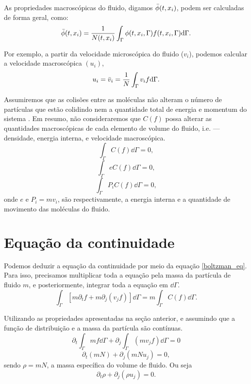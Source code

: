  As propriedades macroscópicas do fluido, digamos $\Bar{\phi}(t, x_{i})$, podem ser calculadas de forma geral, como:
\begin{equation}
    \Bar{\phi}(t, x_{i}) = \frac{1}{N(t, x_{i})} \int_{\Gamma} \phi(t, x_{i}, \Gamma) f(t, x_{i}, \Gamma) \dd\Gamma.
\end{equation}

Por exemplo, a partir da velocidade microscópica do fluido ($v_{i}$), podemos calcular a velocidade macroscópica $(u_{i})$,
\begin{equation}\label{velocity_filter}
    u_{i} = \Bar{v}_{i} = \frac{1}{N} \int_{\Gamma} v_{i}f \dd\Gamma.
\end{equation}

Assumiremos que as colisões entre as moléculas não alteram o número de partículas que estão colidindo nem a quantidade total de energia e momentum do sistema \cite{pitaevskii2012physical}. Em resumo, não consideraremos que $C(f)$ possa alterar as quantidades macroscópicas de cada elemento de volume do fluido, i.e. — densidade, energia interna, e velocidade macroscópica.
\begin{equation}
\int_{\Gamma} C(f) \dd\Gamma = 0,
\end{equation}
\begin{equation}
\int_{\Gamma} e C(f) \dd\Gamma = 0,
\end{equation}
\begin{equation}\label{momentum_conservation}
\int_{\Gamma} P_{i}C(f) \dd\Gamma = 0,
\end{equation}
onde $e$ e $P_{i} = mv_{i}$, são respectivamente, a energia interna e a quantidade de movimento das moléculas do fluido.
\section{Equação da continuidade}
Podemos deduzir a equação da continuidade por meio da equação \ref{boltzman_eq}. Para isso, precisamos multiplicar toda a equação pela massa da partícula de fluido $m$, e posteriormente, integrar toda a equação em $\dd\Gamma$.
\begin{equation}
\int_{\Gamma}[m\partial_{t}f + m\partial_{j}(v_{j}f) ]\dd\Gamma = m\int_{\Gamma} C(f) \dd\Gamma.
\end{equation}

Utilizando as propriedades apresentadas na seção anterior, e assumindo que a função de distribuição e a massa da partícula são contínuas.
\begin{equation*}
\partial_{t}\int_{\Gamma}mf\dd\Gamma + \partial_{j} \int_{\Gamma}(mv_{j}f)\dd\Gamma = 0
\end{equation*}
\begin{equation*}
\partial_{t}(mN)+ \partial_{j} (mNu_{j})= 0,
\end{equation*}
sendo $\rho = mN$, a massa específica do volume de fluido. Ou seja
\begin{equation}\label{continuity_eq}
\partial_{t}\rho+ \partial_{j} (\rho u_{j})= 0.
\end{equation}

